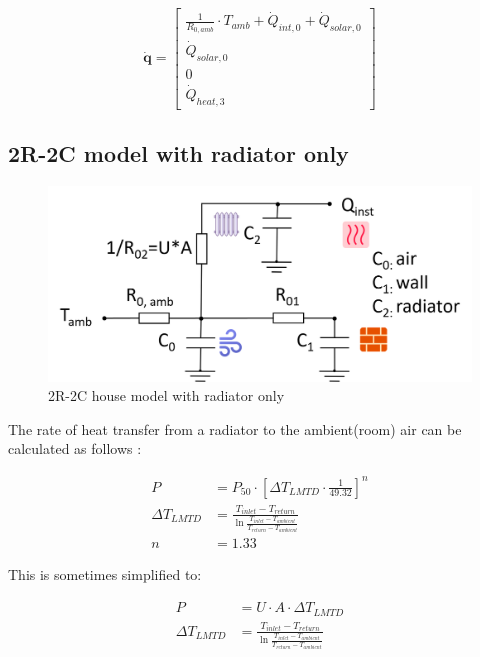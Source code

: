 \begin{equation}
	\mathbf{\dot{q}} =
	\begin{bmatrix}
		\frac{1}{R_{0, amb}} \cdot T_{amb} + \dot{Q}_{int, 0} + \dot{Q}_{solar, 0} \\
		\dot{Q}_{solar, 0} \\
		0 \\
		\dot{Q}_{heat, 3}
	\end{bmatrix}
\end{equation}

\subsection{2R-2C model with radiator only}

\begin{figure}[H]
	\centering
	\includegraphics[width=0.7\columnwidth]{Pictures/2R2C_radiator.png}
	\caption[Short title]{2R-2C house model with radiator only}
	\label{fig:2R2Cradiator}
\end{figure} 

The rate of heat transfer from a radiator to the ambient(room) air can be calculated as follows \cite{heatemissionrad}:

\begin{equation}
	\begin{aligned}
	    P & = P_{50} \cdot \left[\Delta T_{LMTD} \cdot \frac{1}{49.32}\right]^n \\
	    \Delta T_{LMTD} & = \frac{ T_{inlet} - T_{return} }{\ln \frac{ T_{inlet} - T_{ambient} }{T_{return} - T_{ambient}}} \\
	    n & = 1.33
    \end{aligned}
\end{equation}

This is sometimes simplified to:

\begin{equation}
	\begin{aligned}
		P & = U \cdot A \cdot \Delta T_{LMTD} \\
		\Delta T_{LMTD} & = \frac{ T_{inlet} - T_{return} }{\ln \frac{ T_{inlet} - T_{ambient} }{T_{return} - T_{ambient}}}
	\end{aligned}
\end{equation}

